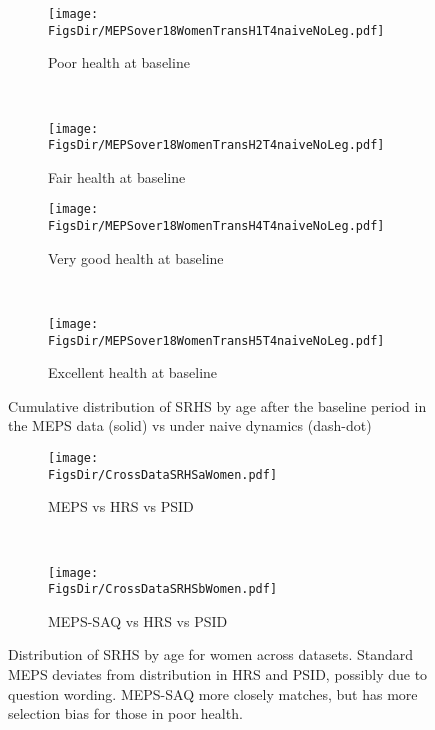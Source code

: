 \documentclass[12pt,pdftex,letterpaper]{article}
\newcommand{\RootDir}{..}
\newcommand{\FigsDir}{\RootDir/Figures}
\begin{document}
\newpage


\begin{figure}[H]
	\centering
	\begin{subfigure}[b]{0.45\textwidth}
		\texttt{[image: \\FigsDir/MEPSover18WomenTransH1T4naiveNoLeg.pdf]}
		\caption{Poor health at baseline}\label{fig:Naive4AheadPoor}
	\end{subfigure}
	~
	\begin{subfigure}[b]{0.45\textwidth}
		\texttt{[image: \\FigsDir/MEPSover18WomenTransH2T4naiveNoLeg.pdf]}
		\caption{Fair health at baseline}\label{fig:Naive4AheadFair}
	\end{subfigure}
	
	\begin{subfigure}[b]{0.45\textwidth}
		\texttt{[image: \\FigsDir/MEPSover18WomenTransH4T4naiveNoLeg.pdf]}
		\caption{Very good health at baseline}\label{fig:Naive4AheadVeryGood}
	\end{subfigure}
	~
	\begin{subfigure}[b]{0.45\textwidth}
		\texttt{[image: \\FigsDir/MEPSover18WomenTransH5T4naiveNoLeg.pdf]}
		\caption{Excellent health at baseline}\label{fig:Naive4AheadExcellent}
	\end{subfigure}
	\caption{Cumulative distribution of SRHS by age after the baseline period in the MEPS data (solid) vs under naive dynamics (dash-dot)}\label{fig:NaiveTrans4Ahead}
\end{figure}


\begin{figure}[H]
	\centering
	\begin{subfigure}[b]{0.48\textwidth}
		\texttt{[image: \\FigsDir/CrossDataSRHSaWomen.pdf]}
		\caption{MEPS vs HRS vs PSID}\label{fig:SRHScompareA}
	\end{subfigure}
    ~
    \begin{subfigure}[b]{0.48\textwidth}
    	\texttt{[image: \\FigsDir/CrossDataSRHSbWomen.pdf]}
    	\caption{MEPS-SAQ vs HRS vs PSID}\label{fig:SRHScompareB}
    \end{subfigure}
	\caption{Distribution of SRHS by age for women across datasets. Standard MEPS deviates from distribution in HRS and PSID, possibly due to question wording.  MEPS-SAQ more closely matches, but has more selection bias for those in poor health.}\label{fig:SRHScompare}
\end{figure}


\newpage
\end{document}
